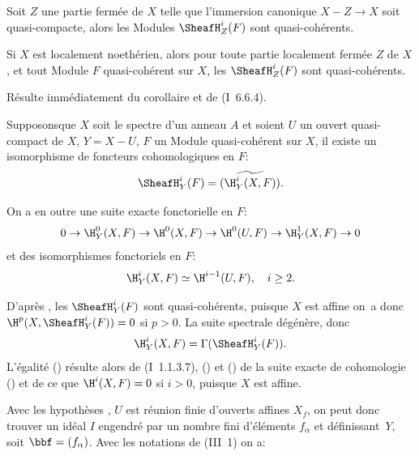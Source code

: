 \begin{supcorollaire} \label{II.2}
Soit $Z$ une partie ferm\'ee de $X$ telle que l'immersion canonique \hbox{$X-Z\to X$} soit quasi-compacte, alors les Modules ${\SheafH}_Z^i(F)$ sont quasi-coh\'erents.
\end{supcorollaire}

\begin{supcorollaire} \label{II.3}
Si $X$ est localement noeth\'erien, alors pour toute partie localement ferm\'ee $Z$ de $X$, et tout Module $F$ quasi-coh\'erent sur $X$, les ${\SheafH}_Z^i(F)$ sont quasi-coh\'erents.
\end{supcorollaire}

R\'esulte imm\'ediatement du corollaire  et de (\EGA I~6.6.4).

\begin{supcorollaire} \label{II.4}
Supposons\pageoriginaled que $X$ soit le spectre d'un anneau $A$ et soient $U$ un ouvert quasi-compact de $X$, $Y=X-U$, $F$ un Module quasi-coh\'erent sur $X$, il existe un isomorphisme de foncteurs cohomologiques en $F$:
\begin{equation} \label{eq:II.4.1} {\SheafH}_Y^i(F) = \widetilde{(\H_Y^i(X, F))}.
\end{equation}

On a en outre une suite exacte fonctorielle en $F$:
\begin{equation} \label{eq:II.4.2}
0 \to \H_Y^0(X, F) \to \H^0(X, F) \to \H^0(U, F) \to \H_Y^1(X, F) \to 0
\end{equation}
et des isomorphismes fonctoriels en $F$:
\begin{equation} \label{eq:II.4.3}
\H_Y^i(X, F) \simeq \H^{i-1}(U, F), \quad i\geq 2.
\end{equation}
\end{supcorollaire}

D'apr\`es , les ${\SheafH}_Y^i(F)$ sont quasi-coh\'erents, puisque $X$ est affine on~a donc $\H^p(X, {\SheafH}_Y^i(F))=0$ si $p>0$. La suite spectrale  d\'eg\'en\`ere, donc
$$
\H_Y^i(X, F) = \Gamma({\SheafH}_Y^i(F)).
$$
L'\'egalit\'e () r\'esulte alors de (\EGA I~1.1.3.7), () et () de la suite exacte de cohomologie () et de ce que $\H^i(X, F)=0$ si $i>0$, puisque $X$ est affine.

Avec les hypoth\`eses , $U$ est r\'eunion finie d'ouverts affines $X_f$, on peut donc trouver un id\'eal $I$ engendr\'e par un nombre fini d'\'el\'ements $f_{\alpha}$ et d\'efinissant~$Y$, soit $\bbf=(f_{\alpha})$. Avec les notations de (\EGA III~1) on a:

